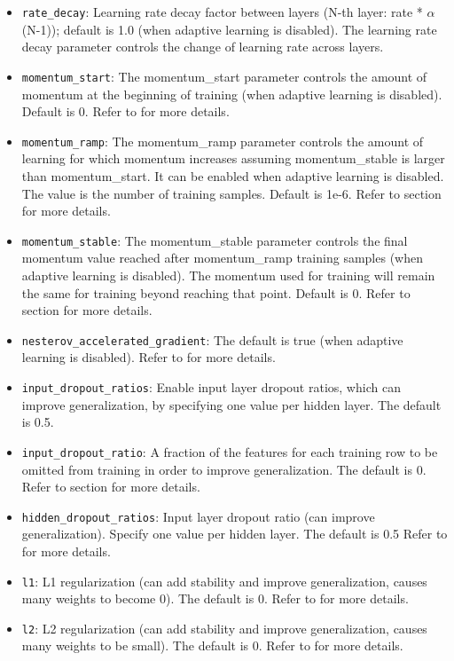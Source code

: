 \documentclass{article}[11pt]
\begin{document}
\begin{itemize}
\item \texttt{rate\_decay}: Learning rate decay factor between layers (N-th layer: rate * $\alpha$ (N-1)); default is 1.0 (when adaptive learning is disabled). The learning rate decay parameter controls the change of learning rate across layers.
\item \texttt{momentum\_start}: The momentum\_start parameter controls the amount of momentum at the beginning of training (when adaptive learning is disabled). Default is 0. Refer to  for more details.
\item \texttt{momentum\_ramp}: The momentum\_ramp parameter controls the amount of learning for which momentum increases assuming momentum\_stable is larger than momentum\_start. It can be enabled when adaptive learning is disabled. The value is the number of training samples. Default is 1e-6. Refer to section  for more details.
\item \texttt{momentum\_stable}: The momentum\_stable parameter controls the final momentum value reached after momentum\_ramp training samples (when adaptive learning is disabled). The momentum used for training will remain the same for training beyond reaching that point. Default is 0.  Refer to section  for more details.
\item \texttt{nesterov\_accelerated\_gradient}: The default is true (when adaptive learning is disabled). Refer to  for more details.
\item \texttt{input\_dropout\_ratios}: Enable input layer dropout ratios, which can improve generalization, by specifying one value per hidden layer. The default is 0.5. 
\item \texttt{input\_dropout\_ratio}: A fraction of the features for each training row to be omitted from training in order to improve generalization. The default is 0.  Refer to section  for more details.
\item \texttt{hidden\_dropout\_ratios}:  Input layer dropout ratio (can improve generalization). Specify one value per hidden layer. The default is 0.5 Refer to   for more details.
\item \texttt{l1}: L1 regularization (can add stability and improve generalization, causes many weights to become 0). The default is 0. Refer to  for more details.
\item \texttt{l2}: L2 regularization (can add stability and improve generalization, causes many weights to be small). The default is 0. Refer to   for more details.

\end{itemize}
\end{document}
